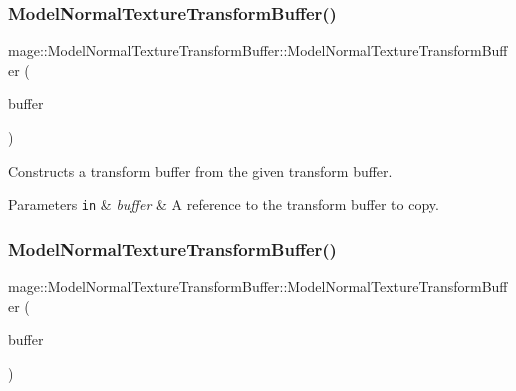 \subsubsection{\texorpdfstring{Model\+Normal\+Texture\+Transform\+Buffer()}{ModelNormalTextureTransformBuffer()}\hspace{0.1cm}{\footnotesize\ttfamily [2/3]}}
{\footnotesize\ttfamily mage\+::\+Model\+Normal\+Texture\+Transform\+Buffer\+::\+Model\+Normal\+Texture\+Transform\+Buffer (\begin{DoxyParamCaption}\item[{const \hyperlink{structmage_1_1_model_normal_texture_transform_buffer}{Model\+Normal\+Texture\+Transform\+Buffer} \&}]{buffer }\end{DoxyParamCaption})\hspace{0.3cm}{\ttfamily [default]}}

Constructs a transform buffer from the given transform buffer.


\begin{DoxyParams}[1]{Parameters}
\mbox{\tt in}  & {\em buffer} & A reference to the transform buffer to copy. \\
\hline
\end{DoxyParams}
\hypertarget{structmage_1_1_model_normal_texture_transform_buffer_a8d35262220485ab7657991f93553a52c}{}\label{structmage_1_1_model_normal_texture_transform_buffer_a8d35262220485ab7657991f93553a52c} 
\subsubsection{\texorpdfstring{Model\+Normal\+Texture\+Transform\+Buffer()}{ModelNormalTextureTransformBuffer()}\hspace{0.1cm}{\footnotesize\ttfamily [3/3]}}
{\footnotesize\ttfamily mage\+::\+Model\+Normal\+Texture\+Transform\+Buffer\+::\+Model\+Normal\+Texture\+Transform\+Buffer (\begin{DoxyParamCaption}\item[{\hyperlink{structmage_1_1_model_normal_texture_transform_buffer}{Model\+Normal\+Texture\+Transform\+Buffer} \&\&}]{buffer }\end{DoxyParamCaption})\hspace{0.3cm}{\ttfamily [default]}}

